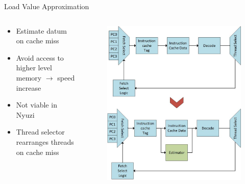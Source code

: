 \documentclass{beamer}
\begin{document}
\begin{frame}{Load Value Approximation}
\begin {columns}
 \begin{column}{0.5\textwidth}
 
    \begin{itemize}
        \item<1->Estimate datum on cache miss
        \item<2->Avoid access to higher level memory $\rightarrow$ speed increase
        \item<3->Not viable in Nyuzi
        \item<4->Thread selector rearranges threads on cache miss
    \end{itemize}
    
 \end{column}
  \begin{column}{0.5\textwidth}
    \begin{figure}
     \includegraphics[width=\textwidth]{img/loadValueApproximation.jpg}
    \end{figure}
  \end{column}
\end {columns}
\end{frame}
\end{document}
